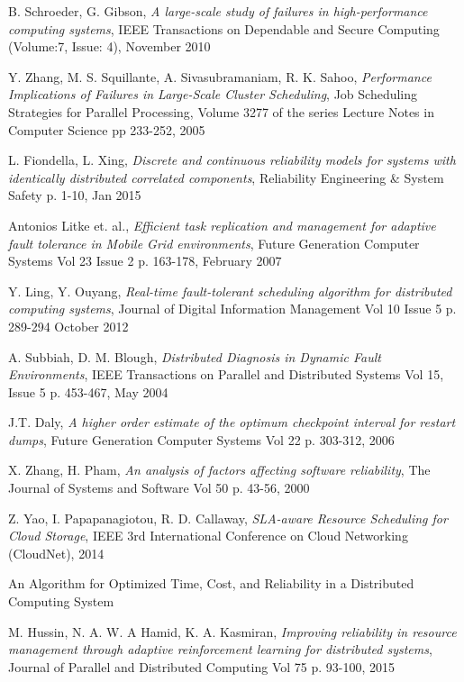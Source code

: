 \documentclass{cslthse-msc}
\begin{document}
\begin{thebibliography}{50}
	B. Schroeder, G. Gibson,
	\emph{A large-scale study of failures in high-performance computing systems},
	IEEE Transactions on Dependable and Secure Computing (Volume:7, Issue: 4),
	November 2010

	Y. Zhang, M. S. Squillante, A. Sivasubramaniam, R. K. Sahoo,
	\emph{Performance Implications of Failures in Large-Scale Cluster Scheduling},
	Job Scheduling Strategies for Parallel Processing, Volume 3277 of the series Lecture Notes in Computer Science pp 233-252,
	2005

	L. Fiondella, L. Xing,
	\emph{Discrete and continuous reliability models for systems with identically distributed correlated components},
	Reliability Engineering \& System Safety p. 1-10,
	Jan 2015

	Antonios Litke et. al.,	
	\emph{Efficient task replication and management for adaptive fault tolerance in Mobile Grid environments},
	Future Generation Computer Systems Vol 23 Issue 2 p. 163-178,
	February 2007

	Y. Ling, Y. Ouyang,
	\emph{Real-time fault-tolerant scheduling algorithm for distributed computing systems},
	Journal of Digital Information Management Vol 10 Issue 5 p. 289-294
	October 2012

	A. Subbiah, D. M. Blough,
	\emph{Distributed Diagnosis in Dynamic Fault Environments},
	IEEE Transactions on Parallel and Distributed Systems Vol 15, Issue 5 p. 453-467,
	May 2004

	J.T. Daly,
	\emph{A higher order estimate of the optimum checkpoint interval for restart dumps},
	Future Generation Computer Systems Vol 22 p. 303-312,
	2006

	X. Zhang, H. Pham,
	\emph{An analysis of factors affecting software reliability},
	The Journal of Systems and Software Vol 50 p. 43-56,
	2000

	Z. Yao, I. Papapanagiotou, R. D. Callaway,
	\emph{SLA-aware Resource Scheduling for Cloud Storage},
	IEEE 3rd International Conference on Cloud Networking (CloudNet),
	2014

An Algorithm for Optimized Time, Cost, and Reliability in a Distributed Computing System

	M. Hussin, N. A. W. A Hamid, K. A. Kasmiran,
	\emph{Improving reliability in resource management through adaptive reinforcement learning for distributed systems},
Journal of Parallel and Distributed Computing Vol 75 p. 93-100,
	2015


\end{thebibliography}
\end{document}
